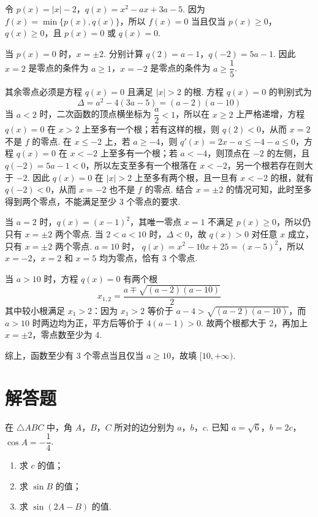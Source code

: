 \begin{solution}
令 \(p(x)=|x|-2\)，\(q(x)=x^2-ax+3a-5\). 因为 \(f(x)=\min\{p(x),q(x)\}\)，所以 \(f(x)=0\) 当且仅当 \(p(x)\geq0\)，\(q(x)\geq0\)，且 \(p(x)=0\) 或 \(q(x)=0\).

当 \(p(x)=0\) 时，\(x=\pm2\). 分别计算
\(q(2)=a-1\)，\(q(-2)=5a-1\). 因此 \(x=2\) 是零点的条件为 \(a\geq1\)，\(x=-2\) 是零点的条件为 \(a\geq\dfrac15\).

其余零点必须是方程 \(q(x)=0\) 且满足 \(|x|>2\) 的根. 方程 \(q(x)=0\) 的判别式为
\[
\Delta=a^2-4(3a-5)=(a-2)(a-10)
\]
当 \(a<2\) 时，二次函数的顶点横坐标为 \(\dfrac a2<1\)，所以在 \(x\geq2\) 上严格递增，方程 \(q(x)=0\) 在 \(x>2\) 上至多有一个根；若有这样的根，则 \(q(2)<0\)，从而 \(x=2\) 不是 \(f\) 的零点. 在 \(x\leq-2\) 上，若 \(a\geq-4\)，则 \(q'(x)=2x-a\leq-4-a\leq0\)，方程 \(q(x)=0\) 在 \(x<-2\) 上至多有一个根；若 \(a<-4\)，则顶点在 \(-2\) 的左侧，且 \(q(-2)=5a-1<0\)，所以左支至多有一个根落在 \(x<-2\)，另一个根若存在则大于 \(-2\). 因此 \(q(x)=0\) 在 \(|x|>2\) 上至多有两个根，且一旦有 \(x<-2\) 的根，就有 \(q(-2)<0\)，从而 \(x=-2\) 也不是 \(f\) 的零点. 结合 \(x=\pm2\) 的情况可知，此时至多得到两个零点，不能满足至少 3 个零点的要求.

当 \(a=2\) 时，\(q(x)=(x-1)^2\)，其唯一零点 \(x=1\) 不满足 \(p(x)\geq0\)，所以仍只有 \(x=\pm2\) 两个零点. 当 \(2<a<10\) 时，\(\Delta<0\)，故 \(q(x)>0\) 对任意 \(x\) 成立，只有 \(x=\pm2\) 两个零点. \(a=10\) 时，
\(q(x)=x^2-10x+25=(x-5)^2\)，所以 \(x=-2\)，\(x=2\) 和 \(x=5\) 均为零点，恰有 3 个零点.

当 \(a>10\) 时，方程 \(q(x)=0\) 有两个根
\[
x_{1,2}=\frac{a\mp\sqrt{(a-2)(a-10)}}2
\]
其中较小根满足 \(x_1>2\)：因为 \(x_1>2\) 等价于 \(a-4>\sqrt{(a-2)(a-10)}\)，而 \(a>10\) 时两边均为正，平方后等价于 \(4(a-1)>0\). 故两个根都大于 2，再加上 \(x=\pm2\)，零点数至少为 4.

综上，函数至少有 3 个零点当且仅当 \(a\geq10\)，故填 \([10,+\infty)\).
\end{solution}

\section{解答题}

\begin{problem}
在 \(\triangle ABC\) 中，角 \(A\)，\(B\)，\(C\) 所对的边分别为 \(a\)，\(b\)，\(c\). 已知 \(a=\sqrt{6}\)，\(b=2c\)，\(\cos A=-\dfrac{1}{4}\).

\begin{enumerate}
\item 求 \(c\) 的值；
\item 求 \(\sin B\) 的值；
\item 求 \(\sin(2A-B)\) 的值.
\end{enumerate}
\end{problem}

